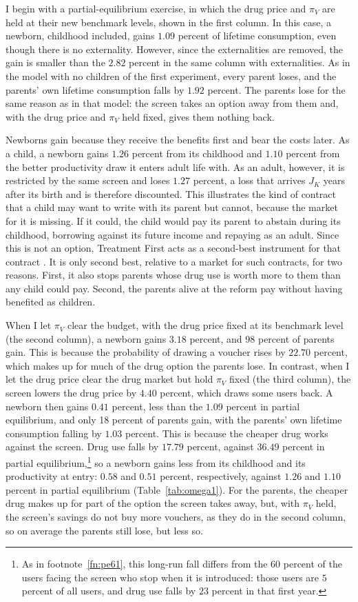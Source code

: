 \documentclass[10pt]{article}
\begin{document}
I begin with a partial-equilibrium exercise, in which the drug price and $\pi_V$ are held at their new benchmark levels, shown in the first column. In this case, a newborn, childhood included, gains $1.09$ percent of lifetime consumption, even though there is no externality. However, since the externalities are removed, the gain is smaller than the $2.82$ percent in the same column with externalities. As in the model with no children of the first experiment, every parent loses, and the parents' own lifetime consumption falls by $1.92$ percent. The parents lose for the same reason as in that model: the screen takes an option away from them and, with the drug price and $\pi_V$ held fixed, gives them nothing back.

Newborns gain because they receive the benefits first and bear the costs later. As a child, a newborn gains $1.26$ percent from its childhood and $1.10$ percent from the better productivity draw it enters adult life with. As an adult, however, it is restricted by the same screen and loses $1.27$ percent, a loss that arrives $J_K$ years after its birth and is therefore discounted. This illustrates the kind of contract that a child may want to write with its parent but cannot, because the market for it is missing. If it could, the child would pay its parent to abstain during its childhood, borrowing against its future income and repaying as an adult. Since this is not an option, Treatment First acts as a second-best instrument for that contract .  It is only second best, relative to a market for such contracts, for two reasons. First, it also stops parents whose drug use is worth more to them than  any child could pay. Second, the parents alive at the reform pay without having benefited as children.  

When I let $\pi_V$ clear the budget, with the drug price fixed at its benchmark level (the second column), a newborn gains $3.18$ percent, and 98 percent of parents gain. This is because the probability of drawing a voucher rises by $22.70$ percent, which makes up for much of the drug option the parents lose. In contrast, when I let the drug price clear the drug market but hold $\pi_V$ fixed (the third column), the screen lowers the drug price by $4.40$ percent, which draws some users back. A newborn then gains $0.41$ percent, less than the $1.09$ percent in partial equilibrium, and only 18 percent of parents gain, with the parents' own lifetime consumption falling by $1.03$ percent. This is because the cheaper drug works against the screen. Drug use falls by $17.79$ percent, against $36.49$ percent in partial equilibrium,\footnote{As in footnote~\ref{fn:pe61}, this long-run fall differs from the $60$ percent of the users facing the screen who stop when it is introduced: those users are $5$ percent of all users, and drug use falls by $23$ percent in that first year.} so a newborn gains less from its childhood and its productivity at entry: $0.58$ and $0.51$ percent, respectively, against $1.26$ and $1.10$ percent in partial equilibrium (Table~\ref{tab:omega1}). For the parents, the cheaper drug makes up for part of the option the screen takes away, but, with $\pi_V$ held, the screen's savings do not buy more vouchers, as they do in the second column, so on average the parents still lose, but less so.
\end{document}
